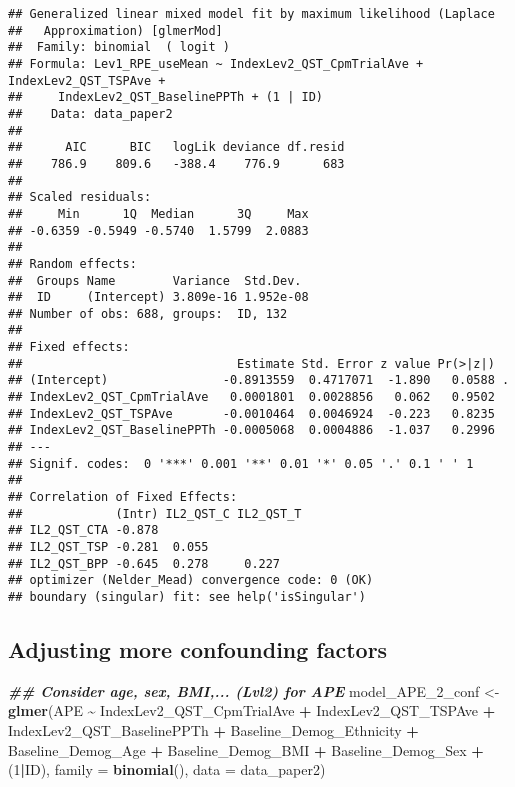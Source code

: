 \documentclass[
  12pt,
]{article}
\newenvironment{Shaded}{\begin{snugshade}}{\end{snugshade}}
\newcommand{\AttributeTok}[1]{\textcolor[rgb]{0.13,0.29,0.53}{#1}}
\newcommand{\DecValTok}[1]{\textcolor[rgb]{0.00,0.00,0.81}{#1}}
\newcommand{\DocumentationTok}[1]{\textcolor[rgb]{0.56,0.35,0.01}{\textbf{\textit{#1}}}}
\newcommand{\FunctionTok}[1]{\textcolor[rgb]{0.13,0.29,0.53}{\textbf{#1}}}
\newcommand{\NormalTok}[1]{#1}
\newcommand{\OtherTok}[1]{\textcolor[rgb]{0.56,0.35,0.01}{#1}}
\newcommand{\SpecialCharTok}[1]{\textcolor[rgb]{0.81,0.36,0.00}{\textbf{#1}}}
\begin{document}
\begin{verbatim}
## Generalized linear mixed model fit by maximum likelihood (Laplace
##   Approximation) [glmerMod]
##  Family: binomial  ( logit )
## Formula: Lev1_RPE_useMean ~ IndexLev2_QST_CpmTrialAve + IndexLev2_QST_TSPAve +  
##     IndexLev2_QST_BaselinePPTh + (1 | ID)
##    Data: data_paper2
## 
##      AIC      BIC   logLik deviance df.resid 
##    786.9    809.6   -388.4    776.9      683 
## 
## Scaled residuals: 
##     Min      1Q  Median      3Q     Max 
## -0.6359 -0.5949 -0.5740  1.5799  2.0883 
## 
## Random effects:
##  Groups Name        Variance  Std.Dev. 
##  ID     (Intercept) 3.809e-16 1.952e-08
## Number of obs: 688, groups:  ID, 132
## 
## Fixed effects:
##                              Estimate Std. Error z value Pr(>|z|)  
## (Intercept)                -0.8913559  0.4717071  -1.890   0.0588 .
## IndexLev2_QST_CpmTrialAve   0.0001801  0.0028856   0.062   0.9502  
## IndexLev2_QST_TSPAve       -0.0010464  0.0046924  -0.223   0.8235  
## IndexLev2_QST_BaselinePPTh -0.0005068  0.0004886  -1.037   0.2996  
## ---
## Signif. codes:  0 '***' 0.001 '**' 0.01 '*' 0.05 '.' 0.1 ' ' 1
## 
## Correlation of Fixed Effects:
##             (Intr) IL2_QST_C IL2_QST_T
## IL2_QST_CTA -0.878                    
## IL2_QST_TSP -0.281  0.055             
## IL2_QST_BPP -0.645  0.278     0.227   
## optimizer (Nelder_Mead) convergence code: 0 (OK)
## boundary (singular) fit: see help('isSingular')
\end{verbatim}

\hypertarget{adjusting-more-confounding-factors}{%
\subsection{Adjusting more confounding
factors}\label{adjusting-more-confounding-factors}}

\begin{Shaded}
\begin{Highlighting}[]
\DocumentationTok{\#\# Consider age, sex, BMI,... (Lvl2) for APE}
\NormalTok{model\_APE\_2\_conf }\OtherTok{\textless{}{-}} \FunctionTok{glmer}\NormalTok{(APE }\SpecialCharTok{\textasciitilde{}}\NormalTok{ IndexLev2\_QST\_CpmTrialAve }\SpecialCharTok{+}\NormalTok{ IndexLev2\_QST\_TSPAve }\SpecialCharTok{+}\NormalTok{ IndexLev2\_QST\_BaselinePPTh }\SpecialCharTok{+}\NormalTok{ Baseline\_Demog\_Ethnicity }\SpecialCharTok{+}\NormalTok{ Baseline\_Demog\_Age }\SpecialCharTok{+}\NormalTok{ Baseline\_Demog\_BMI }\SpecialCharTok{+}\NormalTok{ Baseline\_Demog\_Sex }\SpecialCharTok{+}\NormalTok{ (}\DecValTok{1}\SpecialCharTok{|}\NormalTok{ID), }\AttributeTok{family =} \FunctionTok{binomial}\NormalTok{(), }\AttributeTok{data =}\NormalTok{ data\_paper2)}
\end{Highlighting}
\end{Shaded}
\end{document}
